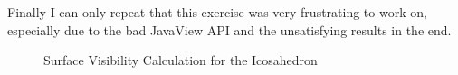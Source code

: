 \documentclass[a4paper,10pt,notitlepage]{scrreprt}
\begin{document}
Finally I can only repeat that this exercise was very frustrating to work on,
especially due to the bad JavaView API and the unsatisfying results in the end.

\begin{figure}
 \caption{Surface Visibility Calculation for the Icosahedron}
 \label{fig:sv-icosahedron}
\end{figure}
\end{document}
